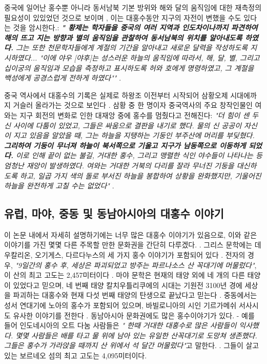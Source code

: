 \documentclass[10pt,twocolumn,letterpaper]{article}
\begin{document}
중국에 일어난 홍수뿐 아니라 동서남북 기본 방위와 해와 달의 움직임에 대한 재측정의 필요성이 있있었던 것으로 보이며 , 이는 대홍수동안 지구의 자전이 변했을 수도 있다는 것을 암시한다.: \textit{\textbf{" 황제는 학자들을 중국의 여러 지역과 인도차이나까지 파견하여 해의 뜨고 지는 방향과 별의 움직임을 관찰하여 동서남북의 위치를 알아내도록 하였다.} 그는 또한 천문학자들에게 계절의 기간을 알아내고 새로운 달력을 작성하도록 지시하였다... "이에 야우 [야후]는 성스러운 하늘의 움직임에 따라서, 해, 달, 별, 그리고 십이궁의 움직임과 모습을 측정하고 표시하도록  허와 호에게 명령하였고, 그 계절을 백성에게 공경스럽게 전하게 하였다""} \cite{5}.

중국 역사에서 대홍수의 기록은 실제로 하왕조 이전부터 시작되어 삼황오제 시대에까지 거슬러 올라가는 것으로 보인다 \cite{7}. 삼황 중 한 명이자 중국역사의 주요 창작인물인 여와는 지구 회전의 변화로 인한 대재앙 중에 홍수를 멈췄다고 전해진다: \textit{"더 힘이 센 두 신 사이에 다툼이 있었고, 그들은 싸움으로 결판을 내기로 했다. 물의 신 공공이 자신이 지고 있음을 알았을 때, 그는 하늘을 지탱하는 기둥인 부주산에 머리를 부딪혔다. \textbf{ 그리하여 기둥이 무너져 하늘이 북서쪽으로 기울고 지구가 남동쪽으로 이동하게 되었다.} 이로 인해 끝이 없는 불길, 거대한 홍수, 그리고 맹렬한 식인 야수들이 나타나는 등 엄청난 재앙이 발생하였다. 여와는 거대한 거북의 다리를 잘라 무너진 기둥을 대신하도록 하고, 일곱 가지 색의 돌로 부서진 하늘을 봉합하여 상황을 완화했지만, 기울어진 하늘을 완전하게 고칠 수는 없었다"} \cite{8}.

\subsection{유럽, 마야, 중동 및 동남아시아의 대홍수 이야기}

이 논문 내에서 자세히 설명하기에는 너무 많은 대홍수 이야기가 있음으로, 이와 같은 이야기를 가진 몇몇 다른 주목할 만한 문화권을 간단히 다루겠다. . 그리스 문학에는 데우칼리온, 오기게스, 다르다누스의 세 가지 홍수 이야기가 포함되어 있다 \cite{9,10}. 전자의 경우, \textit{"9일간의 홍수 후, 세상은 파괴되었고 방주는 파르나소스 산 꼭대기에 머물렀다"}, 이 산의 최고 고도는 2,457미터이다 \cite{11}. 마야 문학은 현재의 태양 외에 네 개의 다른 태양이 있었다고 믿으며, 네 번째 태양 칼치우틀리쿠에의 시대는 기원전 3100년 경에 세상을 파괴하는 대홍수와 현재 다섯 번째 태양의 탄생으로 끝났다고 믿는다 \cite{12}. 중동에서는 성서 연대기에 노아의 홍수가 포함되어 있으며, 바빌로니아의 시인 기르가메쉬 서사시도 유사한 이야기를 전한다 \cite{13}. 동남아시아 문화권에도 많은 홍수이야기가 있다. - 예를 들어  인도네시아의 오트 다눔 사람들은  \textit{" 한때 거대한 대홍수로 많은 사람들이 익사했다. 몇몇 사람들은 배를 타고 물 위에 남아 있는 유일한 산꼭대기로 도망쳐 생존했다. 그들은 홍수가 가라앉을 때까지 산 위에서 석 달간 머물렀다"}고 말한다. \cite{3}. 그들이 살고 있는 보르네오 섬의 최고 고도는 4,095미터이다.
\end{document}

